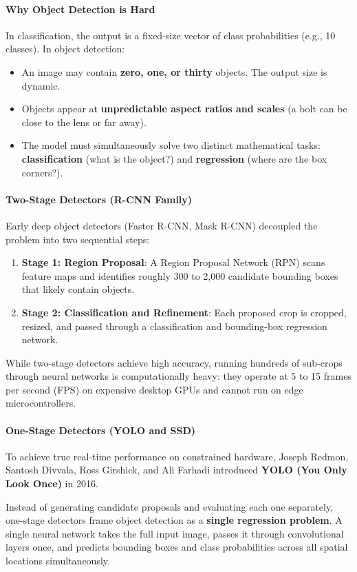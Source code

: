 \paragraph{Why Object Detection is Hard}
In classification, the output is a fixed-size vector of class probabilities (e.g., 10 classes). In object detection:
\begin{itemize}
    \item An image may contain \textbf{zero, one, or thirty} objects. The output size is dynamic.
    \item Objects appear at \textbf{unpredictable aspect ratios and scales} (a bolt can be close to the lens or far away).
    \item The model must simultaneously solve two distinct mathematical tasks: \textbf{classification} (what is the object?) and \textbf{regression} (where are the box corners?).
\end{itemize}

\paragraph{Two-Stage Detectors (R-CNN Family)}
Early deep object detectors (Faster R-CNN, Mask R-CNN) decoupled the problem into two sequential steps:
\begin{enumerate}
    \item \textbf{Stage 1: Region Proposal}: A Region Proposal Network (RPN) scans feature maps and identifies roughly 300 to 2,000 candidate bounding boxes that likely contain objects.
    \item \textbf{Stage 2: Classification and Refinement}: Each proposed crop is cropped, resized, and passed through a classification and bounding-box regression network.
\end{enumerate}
While two-stage detectors achieve high accuracy, running hundreds of sub-crops through neural networks is computationally heavy: they operate at 5 to 15 frames per second (FPS) on expensive desktop GPUs and cannot run on edge microcontrollers.

\paragraph{One-Stage Detectors (YOLO and SSD)}
To achieve true real-time performance on constrained hardware, Joseph Redmon, Santosh Divvala, Ross Girshick, and Ali Farhadi introduced \textbf{YOLO (You Only Look Once)} in 2016. 

Instead of generating candidate proposals and evaluating each one separately, one-stage detectors frame object detection as a \textbf{single regression problem}. A single neural network takes the full input image, passes it through convolutional layers once, and predicts bounding boxes and class probabilities across all spatial locations simultaneously.

